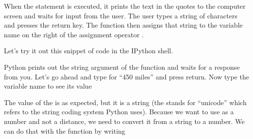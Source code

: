 \documentclass[letterpaper,10pt,english]{sphinxmanual}
\begin{document}
\sphinxAtStartPar
When the  statement is executed, it prints the text in the quotes to the computer screen and waits for input from the user.  The user types a string of characters and presses the return key.  The  function then assigns that string to the variable name on the right of the assignment operator \sphinxcode{\sphinxupquote{=}}.

\sphinxAtStartPar
Let’s try it out this snippet of code in the IPython shell.

\begin{sphinxVerbatim}[commandchars=\\\{\}]
  

\end{sphinxVerbatim}

\sphinxAtStartPar
Python prints out the string argument of the  function and waits for a response from you.  Let’s go ahead and type  for “450 miles” and press return.  Now type the variable name  to see its value

\begin{sphinxVerbatim}[commandchars=\\\{\}]
\end{sphinxVerbatim}

\sphinxAtStartPar
The value of the  is  as expected, but it is a string (the  stands for “unicode” which refers to the string coding system Python uses).  Because we want to use  as a number and not a distance, we need to convert it from a string to a number.  We can do that with the  function by writing

\begin{sphinxVerbatim}[commandchars=\\\{\}]
  

\end{sphinxVerbatim}
\end{document}
